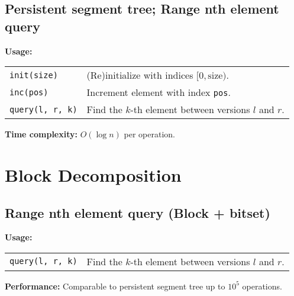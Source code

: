 \subsection{Persistent segment tree; Range nth element query}
\textbf{Usage:} \\[0.1cm]
\begin{tabular}{p{4cm} p{7.5cm}}
  \lstinline|init(size)| & (Re)initialize with indices $[0, \mathrm{size})$. \\
  \lstinline|inc(pos)| & Increment element with index \lstinline|pos|.\\
  \lstinline|query(l, r, k)| & Find the $k$-th element between versions $l$ and $r$. \\
\end{tabular} \par
\textbf{Time complexity:} $O(\log n)$ per operation. \par


\section{Block Decomposition}
\subsection{Range nth element query (Block + bitset)}
\textbf{Usage:} \\[0.1cm]
\begin{tabular}{p{4cm} p{7.5cm}}
  \lstinline|query(l, r, k)| & Find the $k$-th element between versions $l$ and $r$. \\
\end{tabular} \par
\textbf{Performance:} Comparable to persistent segment tree up to $10^5$ operations. \par




